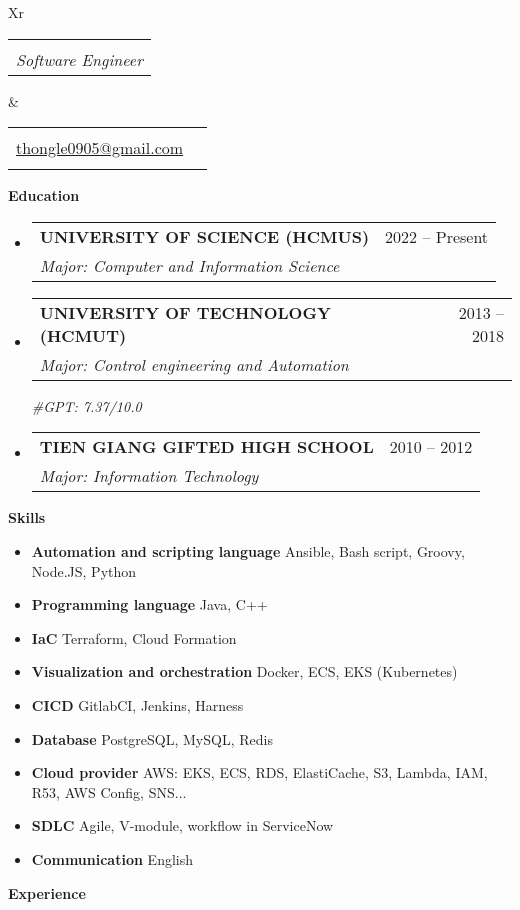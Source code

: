 \documentclass[letterpaper,12pt]{article}[leftmargin=*]
\makeatletter
\def \fullname {Thong Le Hoang}
\def \subtitle {Software Engineer}
\def \phoneicon {\faPhone}
\def \phonetext {+84-347-023-047}
\def \emailicon {\faEnvelope}
\def \emaillink {mailto:thongle0905@gmail.com}
\def \emailtext {thongle0905@gmail.com}
\def \addressicon {\faHome}
\def \addresstext {Ho Chi Minh, Viet Nam}
\def \headertype {\doublecol} %
\def \entryspacing {5pt}
\def \linkedin {\linkedinicon \hspace{3pt}\href{\linkedinlink}{\linkedintext}}
\def \phone {\phoneicon \hspace{3pt}{ \phonetext}}
\def \address {\addressicon \hspace{3pt}{ \addresstext}}
\def \email {\emailicon \hspace{3pt}\href{\emaillink}{\emailtext}}
\def \github {\githubicon \hspace{3pt}\href{\githublink}{\githubtext}}
\def \website {\websiteicon \hspace{3pt}\href{\websitelink}{\websitetext}}
\renewcommand{\section}[2]{\vspace{5pt}
  \colorbox{secondary}{\color{white}\raggedbottom\normalsize\textbf{{#1}{\hspace{7pt}#2}}}
}
\newcommand{\resumeEntryStart}{\begin{itemize}[leftmargin=2.5mm]}
\newcommand{\resumeEntryEnd}{\end{itemize}\vspace{\entryspacing}}
\newcommand{\resumeEntryTSDL}[4]{
  \vspace{-1pt}\item[]
    \begin{tabularx}{0.97\textwidth}{X@{\hspace{60pt}}r}
      \textbf{\color{primary}#1} & {\firabook\color{accent}\small#2} \\
      \textit{\color{accent}\small#3} & {\firabook\color{accent}\small#4} \\
    \end{tabularx}\vspace{-6pt}
}
\newcommand{\resumeEntryS}[2]{
  \item[]\small{
    \textbf{\color{primary}#1 }{ #2 \vspace{-6pt}}
  }
}
\newcommand{\doublecol}[6]{
  \begin{tabularx}{\textwidth}{Xr}
    {
      \begin{tabular}[c]{l}
        \fontsize{35}{45}\selectfont{\color{primary}{{\textbf{\fullname}}}} \\
        {\textit{\subtitle}} %
      \end{tabular}
    } & {
      \begin{tabular}[c]{l@{\hspace{1.5em}}l}
        {\small#4} & {\small#1} \\
        {\small#5} & {\small#2} \\
        {\small#6} & {\small#3}
      \end{tabular}
    }
  \end{tabularx}
}
\newcommand{\singlecol}[6]{
  \begin{tabularx}{\textwidth}{Xr}
    {
      \begin{tabular}[b]{l}
        \fontsize{35}{45}\selectfont{\color{primary}{{\textbf{\fullname}}}} \\
        {\textit{\subtitle}} %
      \end{tabular}
    } & {
      \begin{tabular}[c]{l}
        {\small#1} \\
        {\small#2} \\
        {\small#3} \\
        {\small#4} \\
        {\small#5} \\
        {\small#6}
      \end{tabular}
    }
  \end{tabularx}
}
\makeatother
\begin{document}


\headertype{\linkedin}{\github}{\website}{\phone}{\email}{\address} %
\vspace{10pt} %

\section{\faGraduationCap}{Education}
  \resumeEntryStart
    \resumeEntryTSDL
      {UNIVERSITY OF SCIENCE (HCMUS)}{2022 -- Present}
      {Major: Computer and Information Science}{}
    \resumeEntryTSDL
      {UNIVERSITY OF TECHNOLOGY (HCMUT)}{2013 -- 2018}
      {Major: Control engineering and Automation}{\vspace{5pt}}
      \textit{\color{accent}\small#GPT: 7.37/10.0}
    \resumeEntryTSDL
      {TIEN GIANG GIFTED HIGH SCHOOL}{2010 -- 2012}
      {Major: Information Technology}{}
  \resumeEntryEnd

\section{\faChartLine}{Skills}
 \resumeEntryStart
  \resumeEntryS{Automation and scripting language } {Ansible, Bash script, Groovy, Node.JS, Python}
  \resumeEntryS{Programming language } {Java, C++}
  \resumeEntryS{IaC } {Terraform, Cloud Formation}
  \resumeEntryS{Visualization and orchestration } {Docker, ECS, EKS (Kubernetes)}
  \resumeEntryS{CICD } {GitlabCI, Jenkins, Harness}
  \resumeEntryS{Database } {PostgreSQL, MySQL, Redis}
  \resumeEntryS{Cloud provider } {AWS: EKS, ECS, RDS, ElastiCache, S3, Lambda, IAM, R53, AWS Config, SNS...}
  \resumeEntryS{SDLC } {Agile, V-module, workflow in ServiceNow}
  \resumeEntryS{Communication } {English}
 \resumeEntryEnd

\section{\faBriefcase}{Experience}
\end{document}
